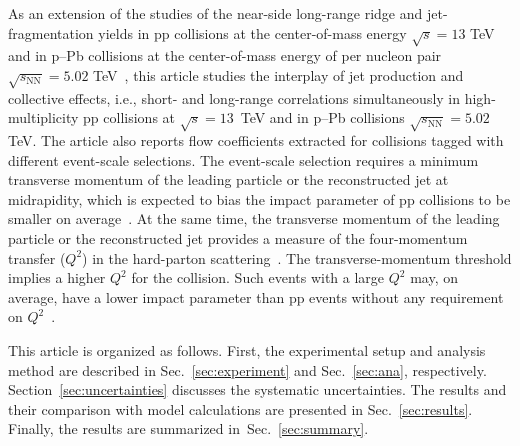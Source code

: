 As an extension of the studies of the near-side long-range ridge and jet-fragmentation yields in pp collisions at the center-of-mass energy $\sqrt{s}=13$ TeV~\cite{ALICE:2021nir} and in p--Pb collisions at the center-of-mass energy of per nucleon pair $\sqrt{s_{\mathrm{NN}}}=5.02$ TeV~\cite{ALICE:2012eyl,ALICE:2013snk}, this article studies the interplay of jet production and collective effects, i.e., short- and long-range correlations simultaneously in high-multiplicity pp collisions at $\sqrt{s} =13$~TeV and in p--Pb collisions $\sqrt{s_{\mathrm{NN}}}=5.02$ TeV. The article also reports flow coefficients extracted for collisions tagged with different event-scale selections. The event-scale selection requires a minimum transverse momentum of the leading particle or the reconstructed jet at midrapidity, which is expected to bias the impact parameter of pp collisions to be smaller on average~\cite{Sjostrand:1986ep,Frankfurt:2003td,Frankfurt:2010ea}. At the same time, the transverse momentum of the leading particle or the reconstructed jet provides a measure of the four-momentum transfer ($Q^2$) in the hard-parton scattering~\cite{Chatrchyan:2012tt, Chatrchyan:2011id}. The transverse-momentum threshold implies a higher $Q^2$ for the collision. Such events with a large $Q^2$ may, on average, have a lower impact parameter than pp events without any requirement on $Q^2$~\cite{Frankfurt:2003td}.

This article is organized as follows. First, the experimental setup and analysis method are described in Sec.~\ref{sec:experiment} and Sec.~\ref{sec:ana}, respectively. Section~\ref{sec:uncertainties} discusses the systematic uncertainties. The results and their comparison with model calculations are presented in Sec.~\ref{sec:results}. Finally, the results are summarized in~Sec.~\ref{sec:summary}.

 
